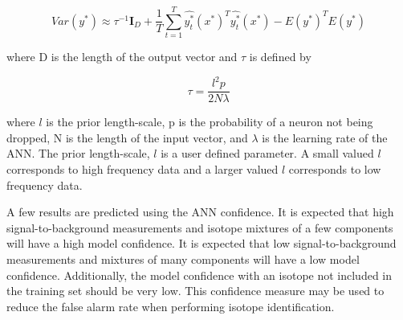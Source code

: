 \documentclass[tocnosub,noragright,centerchapter,12pt,fullpage]{uiucecethesis09}
\begin{document}
\begin{equation} \label{eq:update1}
Var (y^{*}) \approx \tau^{-1} \boldsymbol{I}_D + \frac{1}{T} \sum^{T}_{t=1} \hat{y^{*}_t} (x^{*})^{T} \hat{y^{*}_t}(x^{*}) - E(y^{*})^{T}E(y^{*})
\end{equation}

where D is the length of the output vector and $\tau$ is defined by 

\begin{equation} \label{eq:update1}
\tau = \frac{l^2 p }{2 N \lambda}
\end{equation}

where $l$ is the prior length-scale, p is the probability of a neuron not being dropped, N is the length of the input vector, and $\lambda$ is the learning rate of the ANN. The prior length-scale, $l$ is a user defined parameter. A small valued $l$ corresponds to high frequency data and a larger valued $l$ corresponds to low frequency data. 


A few results are predicted using the ANN confidence. It is expected that high signal-to-background measurements and isotope mixtures of a few components will have a high model confidence. It is expected that low signal-to-background measurements and mixtures of many components will have a low model confidence. Additionally, the model confidence with an isotope not included in the training set should be very low. This confidence measure may be used to reduce the false alarm rate when performing isotope identification. 
 \fi


\end{document}
